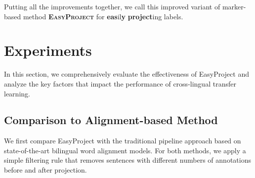 \documentclass[11pt,dvipsnames]{article}
\begin{document}
Putting all the improvements together,  we call this improved variant of marker-based method   \textbf{\textsc{EasyProject}} for \textbf{eas}il\textbf{y} \textbf{project}ing labels.  
































































\section{Experiments}
In this section, we comprehensively evaluate the effectiveness of {\sc EasyProject} and analyze the key factors that impact the performance of  cross-lingual transfer learning. 



\subsection{Comparison to Alignment-based Method}
\label{sec:comparsion_to_alignment}




We first compare EasyProject with  the traditional pipeline approach based on state-of-the-art bilingual word alignment models. For both methods, we apply  a simple filtering rule that removes sentences with different numbers of annotations before and after projection.
\end{document}

